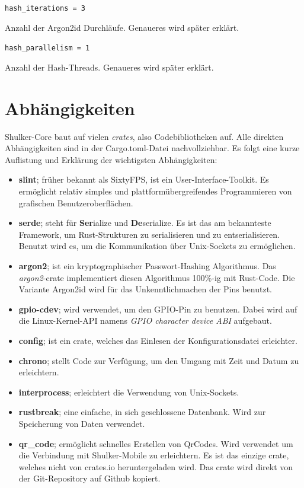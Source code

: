 \lstinline{hash_iterations = 3}

Anzahl der Argon2id Durchläufe. Genaueres wird später erklärt.

\lstinline{hash_parallelism = 1}

Anzahl der Hash-Threads. Genaueres wird später erklärt.


\section{Abhängigkeiten}
Shulker-Core baut auf vielen \textit{crates}, also Codebibliotheken auf. Alle direkten Abhängigkeiten sind in der 
Cargo.toml-Datei nachvollziehbar. Es folgt eine kurze Auflistung und Erklärung der wichtigsten Abhängigkeiten:

\begin{itemize}
    \item \textbf{slint}; früher bekannt als SixtyFPS, ist ein User-Interface-Toolkit. Es ermöglicht relativ simples
    und plattformübergreifendes Programmieren von grafischen Benutzeroberflächen.

    \item \textbf{serde}; steht für \textbf{Ser}ialize und \textbf{De}serialize. Es ist das am bekannteste Framework,
    um Rust-Strukturen zu serialisieren und zu entserialisieren. Benutzt wird es, um die Kommunikation über Unix-Sockets zu
    ermöglichen.

    \item \textbf{argon2}; ist ein kryptographischer Passwort-Hashing Algorithmus. Das \textit{argon2}-crate implementiert diesen
    Algorithmus 100\%-ig mit Rust-Code. Die Variante Argon2id wird für das Unkenntlichmachen der Pins benutzt.

    \item \textbf{gpio-cdev}; wird verwendet, um den GPIO-Pin zu benutzen. Dabei wird auf die Linux-Kernel-API namens \textit{GPIO character device ABI}
    aufgebaut.

    \item \textbf{config}; ist ein crate, welches das Einlesen der Konfigurationsdatei erleichter.
    
    \item \textbf{chrono}; stellt Code zur Verfügung, um den Umgang mit Zeit und Datum zu erleichtern.
    
    \item \textbf{interprocess}; erleichtert die Verwendung von Unix-Sockets.
    
    \item \textbf{rustbreak}; eine einfache, in sich geschlossene Datenbank. Wird zur Speicherung von Daten verwendet.
    
    \item \textbf{qr\_code}; ermöglicht schnelles Erstellen von QrCodes. Wird verwendet um die Verbindung mit Shulker-Mobile zu
    erleichtern. Es ist das einzige crate, welches nicht von crates.io heruntergeladen wird. Das crate wird direkt von der Git-Repository auf
    Github kopiert.
\end{itemize}